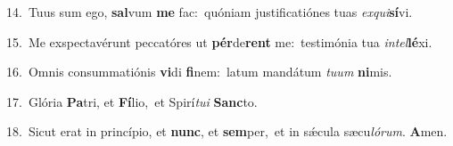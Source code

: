 {\numbfont\textcolor{\numbcolor}{14.}}~Tuus sum ego, \textbf{sal}\-vum \textbf{me} fac:~\star quóniam justificatiónes tuas \textit{ex}\-\textit{qui}\textbf{sí}vi.\par
{\numbfont\textcolor{\numbcolor}{15.}}~Me exspectavérunt peccatóres ut \textbf{pér}\-de\textbf{rent} me:~\star testimónia tua \textit{in}\-\textit{tel}\textbf{lé}xi.\par
{\numbfont\textcolor{\numbcolor}{16.}}~Omnis consummatiónis \textbf{vi}\-di \textbf{fi}\-nem:~\star latum mandátum \textit{tu}\-\textit{um} \textbf{ni}\-mis.\par
{\numbfont\textcolor{\numbcolor}{17.}}~Glória \textbf{Pa}\-tri, et \textbf{Fí}\-lio,~\star et Spirí\-\textit{tu}\-\textit{i} \textbf{Sanc}\-to.\par
{\numbfont\textcolor{\numbcolor}{18.}}~Sicut erat in princípio, et \textbf{nunc}\-, et \textbf{sem}\-per,~\star et in sǽcula sæcu\-\textit{ló}\-\textit{rum}. \textbf{A}\-men.\par
